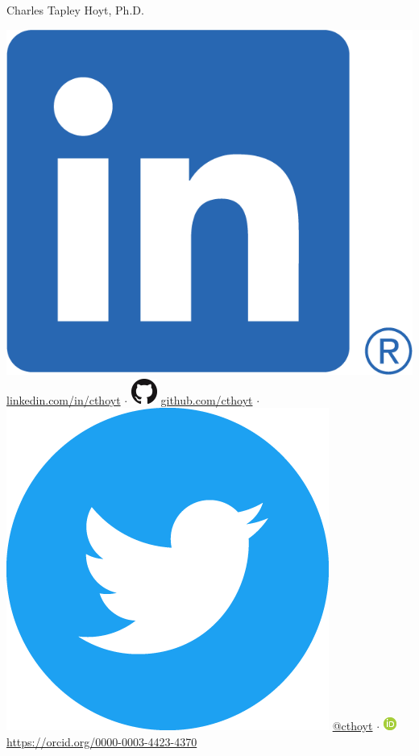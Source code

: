 \documentclass[11pt,a4paper,sans]{moderncv} %
\begin{document}
{\Huge Charles Tapley Hoyt, Ph.D.}

\vspace{3mm}

\includegraphics[scale=0.055]{img/LI-In-Bug.png}
\href{https://linkedin.com/in/cthoyt}{linkedin.com/in/cthoyt}
$\cdot$
\includegraphics[scale=0.25]{img/GitHub-Mark-32px.png}
\href{https://github.com/cthoyt}{github.com/cthoyt}
$\cdot$
\includegraphics[scale=0.02]{img/Twitter_Social_Icon_Circle_Color.png}
\href{https://twitter.com/cthoyt}{@cthoyt}
$\cdot$
\includegraphics[scale=0.5]{img/ORCIDiD_icon16x16.png}
\href{https://orcid.org/0000-0003-4423-4370}{https://orcid.org/0000-0003-4423-4370}
\end{document}
